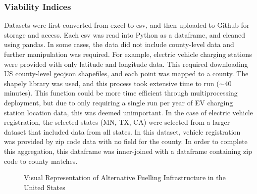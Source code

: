 \documentclass[answers]{exam}
\begin{document}
\subsubsection{Viability Indices}
Datasets were first converted from excel to csv, and then uploaded to Github for storage and access. Each csv was read into Python as a dataframe, and cleaned using pandas. In some cases, the data did not include county-level data and further manipulation was required. For example, electric vehicle charging stations were provided with only latitude and longitude data. This required downloading US county-level geojson shapefiles, and each point was mapped to a county. The shapely library was used, and this process took extensive time to run ($\sim$40 minutes). This function could be more time efficient through multiprocessing deployment, but due to only requiring a single run per year of EV charging station location data, this was deemed unimportant. In the case of electric vehicle registration, the selected states (MN, TX, CA) were selected from a larger dataset that included data from all states. In this dataset, vehicle registration was provided by zip code data with no field for the county. In order to complete this aggregation, this dataframe was inner-joined with a dataframe containing zip code to county matches. 
\begin{figure}[h]
    \centering
    \qquad
    \caption{Visual Representation of Alternative Fuelling Infrastructure in the United States}%
    \label{fig:example}%
\end{figure}
\end{document}
